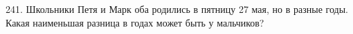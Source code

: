 241. Школьники Петя и Марк оба родились в пятницу 27 мая, но в разные годы. Какая наименьшая разница в годах может быть у мальчиков?\\
